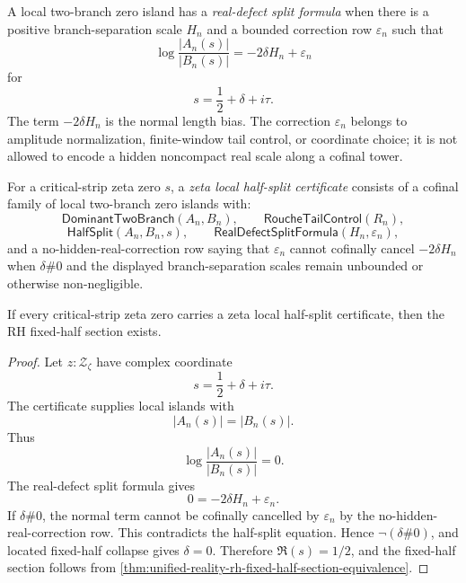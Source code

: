 \begin{definition}
\label{def:unified-reality-real-defect-split-formula}
A local two-branch zero island has a \emph{real-defect split formula}
when there is a positive branch-separation scale $H_n$ and a bounded
correction row $\varepsilon_n$ such that
$$
\log\frac{|A_n(s)|}{|B_n(s)|}
=
-2\delta H_n+\varepsilon_n
$$
for
$$
s=\frac12+\delta+i\tau.
$$
The term $-2\delta H_n$ is the normal length bias.  The correction
$\varepsilon_n$ belongs to amplitude normalization, finite-window tail
control, or coordinate choice; it is not allowed to encode a hidden
noncompact real scale along a cofinal tower.
\end{definition}

\begin{definition}
\label{def:unified-reality-zeta-local-half-split-certificate}
For a critical-strip zeta zero $s$, a \emph{zeta local half-split
certificate} consists of a cofinal family of local two-branch zero
islands with:
$$
\mathsf{DominantTwoBranch}(A_n,B_n),
\qquad
\mathsf{RoucheTailControl}(R_n),
$$
$$
\mathsf{HalfSplit}(A_n,B_n,s),
\qquad
\mathsf{RealDefectSplitFormula}(H_n,\varepsilon_n),
$$
and a no-hidden-real-correction row saying that $\varepsilon_n$ cannot
cofinally cancel $-2\delta H_n$ when $\delta\#0$ and the displayed
branch-separation scales remain unbounded or otherwise non-negligible.
\end{definition}

\begin{theorem}
\label{thm:unified-reality-local-half-split-certificates-conditionally-sufficient}
If every critical-strip zeta zero carries a zeta local half-split
certificate, then the RH fixed-half section exists.
\end{theorem}

\begin{proof}
Let $z:\mathcal Z_{\zeta}$ have complex coordinate
$$
s=\frac12+\delta+i\tau.
$$
The certificate supplies local islands with
$$
|A_n(s)|=|B_n(s)|.
$$
Thus
$$
\log\frac{|A_n(s)|}{|B_n(s)|}=0.
$$
The real-defect split formula gives
$$
0=-2\delta H_n+\varepsilon_n.
$$
If $\delta\#0$, the normal term cannot be cofinally cancelled by
$\varepsilon_n$ by the no-hidden-real-correction row.  This contradicts
the half-split equation.  Hence $\neg(\delta\#0)$, and located
fixed-half collapse gives $\delta=0$.  Therefore $\Re(s)=1/2$, and the
fixed-half section follows from
\autoref{thm:unified-reality-rh-fixed-half-section-equivalence}.
\end{proof}

